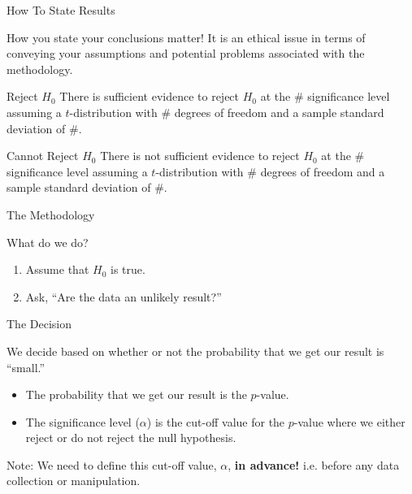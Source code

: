 \begin{frame}{How To State Results}

  How you state your conclusions matter! It is an ethical issue in
  terms of conveying your assumptions and potential problems
  associated with the methodology.

  \begin{block}{Reject $H_0$}
    There is sufficient evidence to reject $H_0$ at the \#
    significance level assuming a $t$-distribution with \# degrees of
    freedom and a sample standard deviation of \#.
  \end{block}

  \begin{block}{Cannot Reject $H_0$}
    There is not sufficient evidence to reject $H_0$ at the \#
    significance level assuming a $t$-distribution with \# degrees of
    freedom and a sample standard deviation of \#.
  \end{block}

  
\end{frame}

\begin{frame}{The Methodology}

  What do we do?

  \begin{enumerate}
  \item Assume that $H_0$ is true.
  \item Ask, ``Are the data an unlikely result?''
  \end{enumerate}

\end{frame}

\begin{frame}{The Decision}

  We decide based on whether or not the probability that we get our
  result  is ``small.''
    \begin{itemize}
    \item The probability that we get our result 
       is the
      $p$-value.


    \item The significance level ($\alpha$) is the cut-off value for
      the $p$-value where we either reject or do not reject the null
      hypothesis.
    \end{itemize}

    \vfill

  {
    Note: We need to define this cut-off value, $\alpha$, \textbf{in
      advance!} i.e. before any data collection or manipulation.
  }

  \vfill  

\end{frame}


